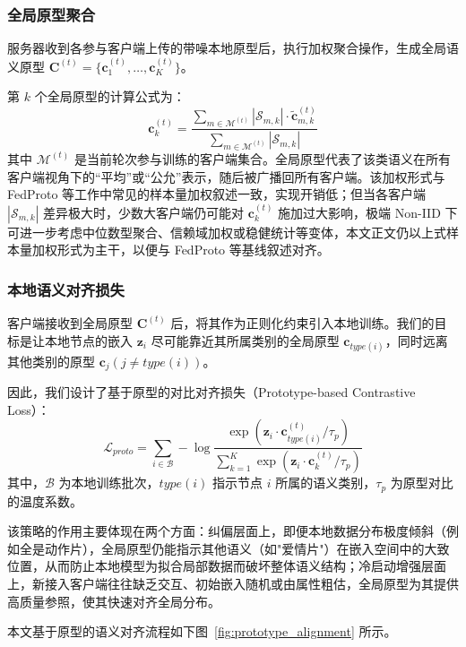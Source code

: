 \subsubsection{全局原型聚合}
服务器收到各参与客户端上传的带噪本地原型后，执行加权聚合操作，生成全局语义原型 $\mathbf{C}^{(t)} = \{ \mathbf{c}_1^{(t)}, \dots, \mathbf{c}_K^{(t)} \}$。

第 $k$ 个全局原型的计算公式为：
\begin{equation}
    \mathbf{c}_k^{(t)} = \frac{\sum_{m \in \mathcal{M}^{(t)}} |\mathcal{S}_{m,k}| \cdot \tilde{\mathbf{c}}_{m,k}^{(t)}}{\sum_{m \in \mathcal{M}^{(t)}} |\mathcal{S}_{m,k}|}
\end{equation}
其中 $\mathcal{M}^{(t)}$ 是当前轮次参与训练的客户端集合。全局原型代表了该类语义在所有客户端视角下的“平均”或“公允”表示，随后被广播回所有客户端。该加权形式与 FedProto 等工作中常见的样本量加权叙述一致，实现开销低；但当各客户端 $|\mathcal{S}_{m,k}|$ 差异极大时，少数大客户端仍可能对 $\mathbf{c}_k^{(t)}$ 施加过大影响，极端 Non-IID 下可进一步考虑中位数型聚合、信赖域加权或稳健统计等变体，本文正文仍以上式样本量加权形式为主干，以便与 FedProto 等基线叙述对齐。

\subsubsection{本地语义对齐损失}
客户端接收到全局原型 $\mathbf{C}^{(t)}$ 后，将其作为正则化约束引入本地训练。我们的目标是让本地节点的嵌入 $\mathbf{z}_i$ 尽可能靠近其所属类别的全局原型 $\mathbf{c}_{type(i)}$，同时远离其他类别的原型 $\mathbf{c}_{j} (j \neq type(i))$。

因此，我们设计了基于原型的对比对齐损失（Prototype-based Contrastive Loss）：
\begin{equation}
    \mathcal{L}_{proto} = \sum_{i \in \mathcal{B}} - \log \frac{\exp(\mathbf{z}_i \cdot \mathbf{c}_{type(i)}^{(t)} / \tau_p)}{\sum_{k=1}^K \exp(\mathbf{z}_i \cdot \mathbf{c}_k^{(t)} / \tau_p)}
    \label{eq:proto_loss}
\end{equation}
其中，$\mathcal{B}$ 为本地训练批次，$type(i)$ 指示节点 $i$ 所属的语义类别，$\tau_p$ 为原型对比的温度系数。

该策略的作用主要体现在两个方面：纠偏层面上，即便本地数据分布极度倾斜（例如全是动作片），全局原型仍能指示其他语义（如"爱情片"）在嵌入空间中的大致位置，从而防止本地模型为拟合局部数据而破坏整体语义结构；冷启动增强层面上，新接入客户端往往缺乏交互、初始嵌入随机或由属性粗估，全局原型为其提供高质量参照，使其快速对齐全局分布。

本文基于原型的语义对齐流程如下图~\ref{fig:prototype_alignment} 所示。

